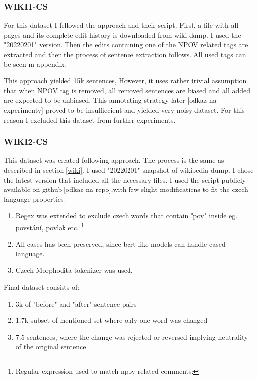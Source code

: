 \subsubsection{WIKI1-CS}
For this dataset I followed the \cite{aleksandrova2019multilingual} approach and their script. First, a file with all pages and its complete edit history is downloaded from wiki dump. I used the "20220201" version. Then the edits containing one of the NPOV related tags are extracted and then the process of sentence extraction follows. All used tags can be seen in appendix.

This approach yielded 15k sentences, However, it uses rather trivial assumption that when NPOV tag is removed, all removed sentences are biased and all added are expected to be unbiased. This annotating strategy later [odkaz na experimenty] proved to be insuffiecient and yielded very noisy dataset. For this reason I excluded this dataset from further experiments.

\subsubsection{WIKI2-CS}
This dataset was created following \cite{pryzant2020automatically} approach. The process is the same as described in section \ref{wiki}. I used "20220201" snapshot of wikipedia dump. I chose the latest version that included all the necessary files.
I used the script publicly available on github [odkaz na repo],with few slight modifications to fit the czech language properties:
\begin{enumerate}
    \item Regex was extended to exclude czech words that contain "pov" inside eg. povstání, povlak etc. \footnote{Regular expression used to match npov related comments: }
    \item All cases has been preserved, since bert like models can handle cased language.
    \item Czech Morphodita tokenizer was used.
\end{enumerate}
\newpage
Final dataset consists of:
\begin{enumerate}
    \item 3k of "before" and "after" sentence pairs
    \item 1.7k subset of mentioned set where only one word was changed
    \item 7.5 sentences, where the change was rejected or reversed implying neutrality of the original sentence
\end{enumerate}

